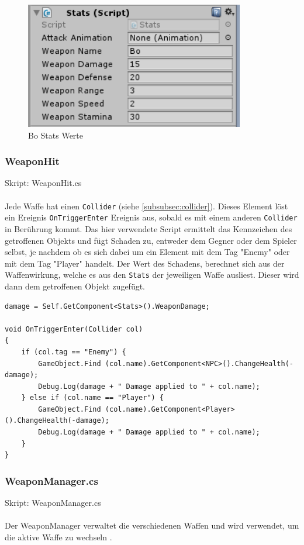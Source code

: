 \begin{figure}[H]
\includegraphics[scale=1]{screenshots/bostats.png}
\caption{Bo Stats Werte}
\end{figure}

\subsubsection{WeaponHit}
Skript: WeaponHit.cs\\\\
Jede Waffe hat einen \lstinline{Collider} (siehe \cref{subsubsec:collider}). Dieses Element löst ein Ereignis \lstinline{OnTriggerEnter} Ereignis aus, sobald es mit einem anderen \lstinline{Collider} in Berührung kommt.
Das hier verwendete Script ermittelt das Kennzeichen des getroffenen Objekts und fügt Schaden zu, entweder dem Gegner oder dem Spieler selbst, je nachdem ob es sich dabei um ein Element mit dem Tag "Enemy" oder mit dem Tag "Player" handelt.
Der Wert des Schadens, berechnet sich aus der Waffenwirkung, welche es aus den \lstinline{Stats} der jeweiligen Waffe ausliest. Dieser wird dann dem getroffenen Objekt zugefügt.

\begin{lstlisting}[caption={Waffentreffer}]
damage = Self.GetComponent<Stats>().WeaponDamage;

void OnTriggerEnter(Collider col)
{
	if (col.tag == "Enemy") {
		GameObject.Find (col.name).GetComponent<NPC>().ChangeHealth(-damage);
		Debug.Log(damage + " Damage applied to " + col.name);
	} else if (col.name == "Player") {
		GameObject.Find (col.name).GetComponent<Player>().ChangeHealth(-damage);
		Debug.Log(damage + " Damage applied to " + col.name);
	}
}
\end{lstlisting}

\subsubsection{WeaponManager.cs}
Skript: WeaponManager.cs\\\\
Der WeaponManager verwaltet die verschiedenen Waffen und wird verwendet, um die aktive Waffe zu wechseln .

